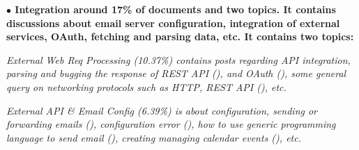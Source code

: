 



\nd\bf{$\bullet$ Integration} around 17\% of documents and two topics. It contains discussions about email server configuration, integration
of external services, OAuth, fetching and parsing data, etc. It contains two
topics: \begin{inparaenum}[(1)] \item \it{External Web Req Processing (10.37\%)}
contains posts regarding API integration, parsing and bugging the response of
REST API (), and OAuth (), some general query on
networking protocols such as HTTP, REST API (), etc.
\item \it{External API \& Email Config (6.39\%)} is about configuration, sending
or forwarding emails (), configuration error (), how
to use generic programming language to send email (), creating
managing calendar events (), etc.
\end{inparaenum} 

